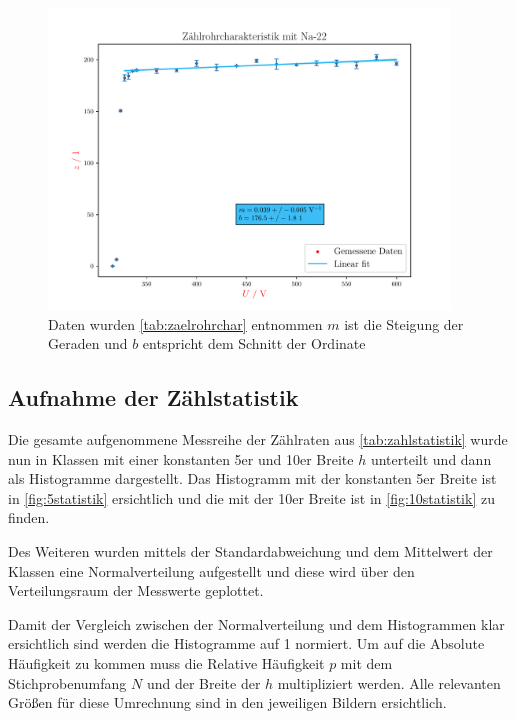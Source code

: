 \documentclass[12pt,english,ngerman]{scrartcl}
\begin{document}
\begin{figure}[H]
  \begin{center}
    \includegraphics[width = 0.95\textwidth]{figures/charakteristik.pdf}
  \end{center}
  \caption[Aufnahme der Zählrohrcharakteristik bei  Probe mit
  linearem Fit]{Daten wurden \autoref{tab:zaelrohrchar} entnommen $m$ ist die
  Steigung der Geraden und $b$ entspricht dem Schnitt der Ordinate}
  \label{fig:zaelrohrchar}
\end{figure}


\subsection{Aufnahme der Zählstatistik}

Die gesamte aufgenommene Messreihe der Zählraten aus
\autoref{tab:zahlstatistik} wurde nun in Klassen mit einer konstanten 5er und
10er Breite $h$ unterteilt und dann als Histogramme dargestellt. Das Histogramm
mit der konstanten 5er Breite ist in \autoref{fig:5statistik} ersichtlich und
die mit der 10er Breite ist in \autoref{fig:10statistik} zu finden.

Des Weiteren wurden mittels der Standardabweichung und dem Mittelwert der
Klassen eine Normalverteilung aufgestellt und diese wird über den
Verteilungsraum der Messwerte geplottet.

Damit der Vergleich zwischen der Normalverteilung und dem Histogrammen 
klar ersichtlich sind werden die Histogramme auf 1 normiert. Um auf die
Absolute Häufigkeit zu kommen muss die Relative Häufigkeit $p$ mit dem
Stichprobenumfang $N$ und der Breite der $h$ multipliziert werden. Alle
relevanten Größen für diese Umrechnung sind in den jeweiligen Bildern
ersichtlich.
\end{document}
